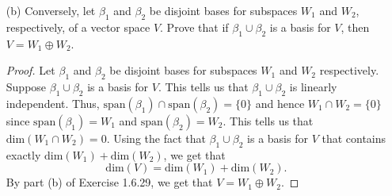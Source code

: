 \begin{enumerate}
\begin{proof}
            Since \( \beta_{1}  \) and \( \beta_{2} \) contain distinct linearly independent vectors, we must have \( \beta_{1} \cap \beta_{2} = \emptyset \). Since \( V  \) is a direct sum of the \( W_{1} \) and \( W_{2} \), we know that \( W_{1} \cap W_{2} = \{ 0 \}  \) by definition. Since \( \beta_{1}  \) and \( \beta_{2} \) generate \( W_{1} \) and \( W_{2} \) respectively, we must have \( \text{span}(\beta_{1}) \cap \text{span}(\beta_{2}) = \{ 0 \}  \). Now, we have the set \( \beta_{1} \cup \beta_{2}  \) as a linearly independent set by exercise 1.5.21. Observe that \(\text{span}(\beta_{1} \cup \beta_{2})  \subseteq V  \) follows immediately. Now, take any \( v \in V  \) that is not in \( \beta_{1} \cup \beta_{2} \) such that adjoining this vector \( v \in V  \) produces a linearly dependent set. By Theorem 1.7, we have \( v \in \text{span}(\beta_{1} \cup \beta_{2}) \). Thus, we have \( V \subseteq \text{span}(\beta_{1} \cup \beta_{2}) \). Hence, \( \beta_{1} \cup \beta_{2} \) is a generating set for \( V  \) and we are done.
        \end{proof}
    \item[(b)] Conversely, let \( \beta_{1} \) and \( \beta_{2} \) be disjoint bases for subspaces \( W_{1} \) and \( W_{2} \), respectively, of a vector space \( V  \). Prove that if \( \beta_{1} \cup \beta_{2} \) is a basis for \( V  \), then \( V = W_{1} \oplus W_{2} \).
        \begin{proof}
        Let \( \beta_{1} \) and \( \beta_{2} \) be disjoint bases for subspaces \( W_{1} \) and \( W_{2} \) respectively. Suppose \( \beta_{1} \cup \beta_{2} \) is a basis for \( V  \). This tells us that \( \beta_{1} \cup \beta_{2} \) is linearly independent. Thus, \( \text{span}(\beta_{1}) \cap \text{span}(\beta_{2}) = \{ 0 \}  \) and hence \( W_{1} \cap W_{2} = \{ 0 \}  \) since \( \text{span}(\beta_{1}) = W_{1} \) and \( \text{span}(\beta_{2}) = W_{2} \). This tells us that \( \text{dim}(W_{1} \cap W_{2}) = 0   \).  Using the fact that \( \beta_{1} \cup \beta_{2} \) is a basis for \( V  \) that contains exactly \( \text{dim}(W_{1}) + \text{dim}(W_{2}) \), we get that          
        \[ \text{dim}(V) = \text{dim}(W_{1}) + \text{dim}(W_{2}). \]
        By part (b) of Exercise 1.6.29, we get that \( V = W_{1} \oplus W_{2} \).
        \end{proof}
\end{enumerate}

